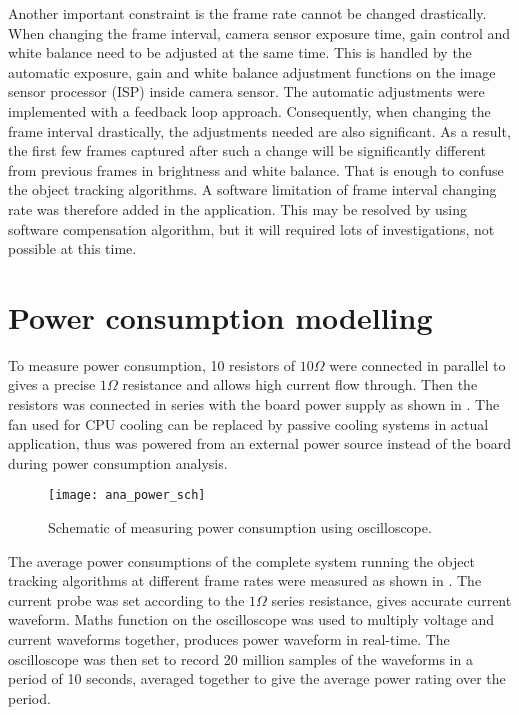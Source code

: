 Another important constraint is the frame rate cannot be changed drastically. When changing the frame interval, camera sensor exposure time, gain control and white balance need to be adjusted at the same time. This is handled by the automatic exposure, gain and white balance adjustment functions on the image sensor processor (ISP) inside camera sensor. The automatic adjustments were implemented with a feedback loop approach. Consequently, when changing the frame interval drastically, the adjustments needed are also significant. As a result, the first few frames captured after such a change will be significantly different from previous frames in brightness and white balance. That is enough to confuse the object tracking algorithms. A software limitation of frame interval changing rate was therefore added in the application. This may be resolved by using software compensation algorithm, but it will required lots of investigations, not possible at this time.




\section{Power consumption modelling}

To measure power consumption, 10 resistors of $10 \Omega$ were connected in parallel to gives a precise $1 \Omega$ resistance and allows high current flow through. Then the resistors was connected in series with the board power supply as shown in . The fan used for CPU cooling can be replaced by passive cooling systems in actual application, thus was powered from an external power source instead of the board during power consumption analysis.

\begin{figure}[H]
  \centering
  \texttt{[image: ana\_power\_sch]}
  \caption{Schematic of measuring power consumption using oscilloscope.}
  \label{ana:power:sch}
\end{figure}

The average power consumptions of the complete system running the object tracking algorithms at different frame rates were measured as shown in . The current probe was set according to the $1 \Omega$ series resistance, gives accurate current waveform. Maths function on the oscilloscope was used to multiply voltage and current waveforms together, produces power waveform in real-time. The oscilloscope was then set to record 20 million samples of the waveforms in a period of 10 seconds, averaged together to give the average power rating over the period.

